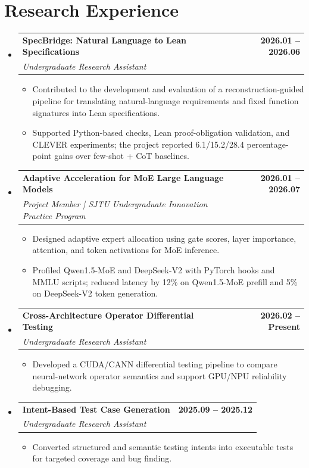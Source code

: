 \documentclass[letterpaper,11pt]{article}
\makeatletter
\newcommand{\resumeItem}[1]{
  \item\small{
    {#1 \vspace{-2pt}}
  }
}
\newcommand{\resumeSubheading}[4]{
  \vspace{-2pt}\item
    \begin{tabular*}{1.0\textwidth}[t]{l@{\extracolsep{\fill}}r}
      \textbf{\color{cvNavy}#1} & \textbf{\small\color{cvTeal} #2} \\
      \textit{\small\color{cvMuted}#3} & \textit{\small\color{cvMuted} #4} \\
    \end{tabular*}\vspace{-7pt}
}
\newcommand{\resumeSubHeadingListStart}{\begin{itemize}[leftmargin=0.0in, label={}]}
\newcommand{\resumeSubHeadingListEnd}{\end{itemize}}
\newcommand{\resumeItemListStart}{\begin{itemize}}
\newcommand{\resumeItemListEnd}{\end{itemize}\vspace{-5pt}}
\makeatother
\begin{document}
\section{Research Experience}
  \resumeSubHeadingListStart

    \resumeSubheading
      {SpecBridge: Natural Language to Lean Specifications}{2026.01 -- 2026.06}
      {Undergraduate Research Assistant}{}
      \resumeItemListStart
        \resumeItem{Contributed to the development and evaluation of a reconstruction-guided pipeline for translating natural-language requirements and fixed function signatures into Lean specifications.}
        \resumeItem{Supported Python-based checks, Lean proof-obligation validation, and CLEVER experiments; the project reported 6.1/15.2/28.4 percentage-point gains over few-shot + CoT baselines.}
      \resumeItemListEnd

    \resumeSubheading
      {Adaptive Acceleration for MoE Large Language Models}{2026.01 -- 2026.07}
      {Project Member | SJTU Undergraduate Innovation Practice Program}{}
      \resumeItemListStart
        \resumeItem{Designed adaptive expert allocation using gate scores, layer importance, attention, and token activations for MoE inference.}
        \resumeItem{Profiled Qwen1.5-MoE and DeepSeek-V2 with PyTorch hooks and MMLU scripts; reduced latency by 12\% on Qwen1.5-MoE prefill and 5\% on DeepSeek-V2 token generation.}
      \resumeItemListEnd

    \resumeSubheading
      {Cross-Architecture Operator Differential Testing}{2026.02 -- Present}
      {Undergraduate Research Assistant}{}
      \resumeItemListStart
        \resumeItem{Developed a CUDA/CANN differential testing pipeline to compare neural-network operator semantics and support GPU/NPU reliability debugging.}
      \resumeItemListEnd

    \resumeSubheading
      {Intent-Based Test Case Generation}{2025.09 -- 2025.12}
      {Undergraduate Research Assistant}{}
      \resumeItemListStart
        \resumeItem{Converted structured and semantic testing intents into executable tests for targeted coverage and bug finding.}
      \resumeItemListEnd

  \resumeSubHeadingListEnd
\vspace{-16pt}

\end{document}
